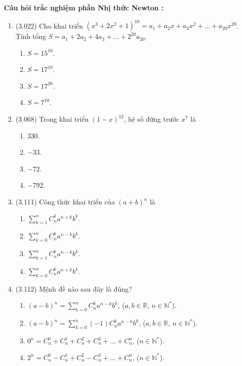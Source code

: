 \noindent\textbf{Câu hỏi trắc nghiệm phần Nhị thức Newton \cite{luyen2018xay}:}\par
\begin{enumerate}[label=\textbf{Câu \arabic*.},align=left,left=0cm..0cm,itemindent=*]
	\item (3.022) Cho khai triển $\left(x^3+2x^2+1\right)^{10}=a_1+a_2x+a_3x^2+...+a_{20}x^{20}$. Tính tổng $S=a_1+2a_2+4a_3+...+2^{20}a_{20}$.
	\begin{enumerate}[label=\textbf{\Alph*.},align=left,left=1cm..0cm,itemindent=*]
	    \item $S=15^{10}$. \item $S=17^{10}$. \item $S=17^{20}$. \item $S=7^{10}$.
	\end{enumerate}
	\item (3.068) Trong khai triển $(1-x)^{12}$, hệ số đứng trước $x^7$ là
	\begin{enumerate}[label=\textbf{\Alph*.},align=left,left=1cm..0cm,itemindent=*]
	    \item $330$. \item $-33$. \item $-72$. \item $-792$.
	\end{enumerate}
	\item (3.111) Công thức khai triển của $(a+b)^n$ là
	\begin{enumerate}[label=\textbf{\Alph*.},align=left,left=1cm..0cm,itemindent=*]
	    \item $\sum_{k=1}^nC_n^ka^{n+k}b^k$. \item $\sum_{k=0}^nC_n^ka^{n-k}b^k$. \item $\sum_{k=1}^nC_n^ka^{n-k}b^k$. \item $\sum_{k=0}^nC_n^ka^{n+k}b^k$.
	\end{enumerate}
	\item (3.112) Mệnh đề nào sau đây là đúng?
	\begin{enumerate}[label=\textbf{\Alph*.},align=left,left=1cm..0cm,itemindent=*]
	    \item $(a-b)^n=\sum_{k=0}^nC_n^ka^{n-k}b^k$, ($a,b\in\mathbb{R}$, $n\in\mathbb{N}^{*}$).
	    \item $(a-b)^n=\sum_{k=0}^n(-1)C_n^ka^{n-k}b^k$, ($a,b\in\mathbb{R}$, $n\in\mathbb{N}^{*}$).
	    \item $0^n=C_n^0+C_n^1+C_n^2+C_n^3+\ldots+C_n^n$, ($n\in\mathbb{N}^{*}$).
	    \item $2^n=C_n^0-C_n^1+C_n^2-C_n^3+\ldots+C_n^n$, ($n\in\mathbb{N}^{*}$).

\end{enumerate}
\end{enumerate}
